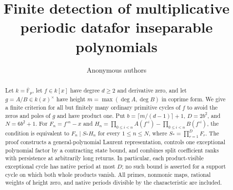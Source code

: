 \documentclass[11pt]{article}
\title{Finite detection of multiplicative periodic data\newline for inseparable polynomials}
\author{Anonymous authors}
\date{}
\theoremstyle{definition}
\numberwithin{equation}{section}
\begin{document}
\maketitle
\begin{abstract}
Let $k=\overline{\mathbb F}_p$, let $f\in k[x]$ have degree $d\ge2$
and derivative zero, and let $g=A/B\in k(x)^\times$ have height
$m=\max(\deg A,\deg B)$ in coprime form. We give a finite criterion
for all but finitely many ordinary primitive cycles of $f$ to avoid
the zeros and poles of $g$ and have product one. Put
$b=\lceil m/(d-1)\rceil+1$, $D=2b^2$, and $N=6b^2+1$.
For $F_n=f^{\circ n}-x$ and
$H_n=\prod_{0\le i<n}A(f^{\circ i})-\prod_{0\le i<n}B(f^{\circ i})$,
the condition is equivalent to $F_n\mid S_*H_n$ for every
$1\le n\le N$, where $S_*=\prod_{r=1}^{D}F_r$.
The proof constructs a general-polynomial Laurent representation,
controls one exceptional polynomial factor by a contracting state
bound, and combines split coefficient ranks with persistence at
arbitrarily long returns. In particular, each product-visible
exceptional cycle has native period at most $D$; no such bound is
asserted for a support cycle on which both whole products vanish.
All primes, nonmonic maps, rational weights of height zero, and
native periods divisible by the characteristic are included.
\end{abstract}










\end{document}
